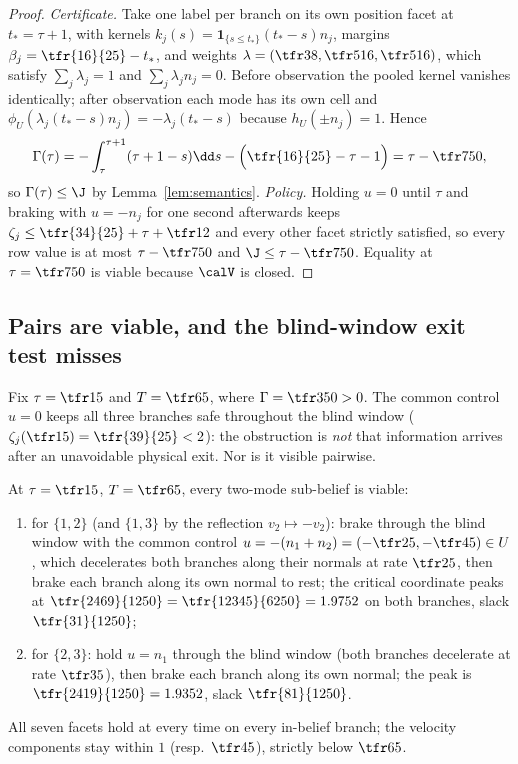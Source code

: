 \begin{proof}
\emph{Certificate.} Take one label per branch on its own position facet at $t_\ast=\tau+1$, with kernels $k_j(s)=\mathbf 1_{\{s\le t_\ast\}}(t_\ast-s)n_j$, margins $\beta_j=\tfr{16}{25}-t_\ast$, and weights $\lambda=(\tfr38,\tfr5{16},\tfr5{16})$, which satisfy $\sum_j\lambda_j=1$ and $\sum_j\lambda_jn_j=0$. Before observation the pooled kernel vanishes identically; after observation each mode has its own cell and $\phi_U(\lambda_j(t_\ast-s)n_j)=-\lambda_j(t_\ast-s)$ because $h_U(\pm n_j)=1$. Hence
\begin{equation}\label{eq:gamma-tau}
\Gamma(\tau)=-\int_\tau^{\tau+1}(\tau+1-s)\dd s-\Bigl(\tfr{16}{25}-\tau-1\Bigr)=\tau-\tfr7{50},
\end{equation}
so $\Gamma(\tau)\le\J$ by Lemma~\ref{lem:semantics}. \emph{Policy.} Holding $u=0$ until $\tau$ and braking with $u=-n_j$ for one second afterwards keeps $\zeta_j\le\tfr{34}{25}+\tau+\tfr12$ and every other facet strictly satisfied, so every row value is at most $\tau-\tfr7{50}$ and $\J\le\tau-\tfr7{50}$. Equality at $\tau=\tfr7{50}$ is viable because $\calV$ is closed.
\end{proof}

\subsection{Pairs are viable, and the blind-window exit test misses}

Fix $\tau=\tfr15$ and $T=\tfr65$, where $\Gamma=\tfr3{50}>0$. The common control $u=0$ keeps all three branches safe throughout the blind window ($\zeta_j(\tfr15)=\tfr{39}{25}<2$): the obstruction is \emph{not} that information arrives after an unavoidable physical exit. Nor is it visible pairwise.

\begin{proposition}[pairwise viability at $\tau=1/5$]\label{prop:pairs}
At $\tau=\tfr15$, $T=\tfr65$, every two-mode sub-belief is viable:
\begin{enumerate}[label=\textup{(\alph*)},leftmargin=2.2em,itemsep=1pt]
\item for $\{1,2\}$ (and $\{1,3\}$ by the reflection $v_2\mapsto-v_2$): brake through the blind window with the common control $u=-(n_1+n_2)=(-\tfr25,-\tfr45)\in U$, which decelerates both branches along their normals at rate $\tfr25$, then brake each branch along its own normal to rest; the critical coordinate peaks at $\tfr{2469}{1250}=\tfr{12345}{6250}=1.9752$ on both branches, slack $\tfr{31}{1250}$;
\item for $\{2,3\}$: hold $u=n_1$ through the blind window (both branches decelerate at rate $\tfr35$), then brake each branch along its own normal; the peak is $\tfr{2419}{1250}=1.9352$, slack $\tfr{81}{1250}$.
\end{enumerate}
All seven facets hold at every time on every in-belief branch; the velocity components stay within $1$ (resp.\ $\tfr45$), strictly below $\tfr65$.
\end{proposition}

